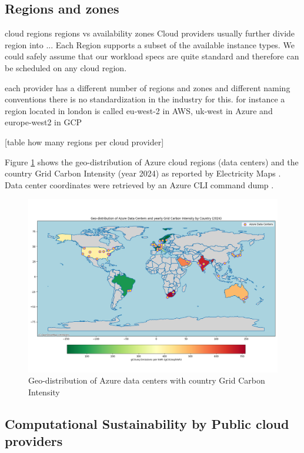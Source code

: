 \subsection{Regions and zones}
cloud regions
regions vs availability zones
Cloud providers usually further divide region into ...
Each Region supports a subset of the available instance types.
We could safely assume that our workload specs are quite standard and therefore can be scheduled on any cloud region.

each provider has a different number of regions and zones and different naming conventions
there is no standardization in the industry for this. 
for instance a region located in london is called eu-west-2 in AWS, uk-west in Azure and europe-west2 in GCP

[table how many regions per cloud provider]

Figure \ref{fig:azure_data_centers} shows the geo-distribution of Azure cloud regions (data centers) and the country Grid Carbon Intensity (year 2024) as reported by Electricity Maps \cite{electricity_maps}. Data center coordinates were retrieved by an Azure CLI command dump \cite{azure_data_centers_information}.

\begin{figure}[htb]
    \centering
    \includegraphics[width=1\linewidth]{images/azure_data_centers.png}
    \caption{Geo-distribution of Azure data centers with country Grid Carbon Intensity}
    \label{fig:azure_data_centers}
\end{figure}


\subsection{Computational Sustainability by Public cloud providers}

